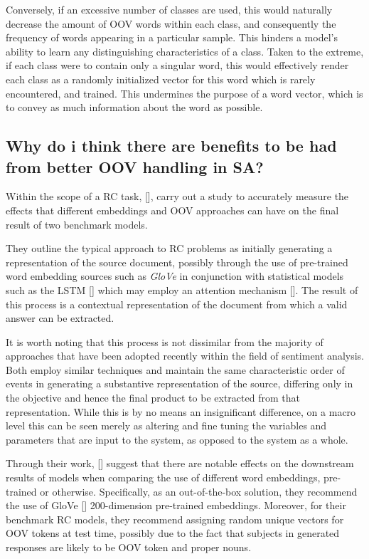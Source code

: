\documentclass[12pt, a4paper]{report}
\theoremstyle{definition}
\theoremstyle{definition}%
\theoremstyle{definition}%
\theoremstyle{definition}%
\theoremstyle{definition}%
\theoremstyle{definition}%
\renewcommand{\cite}[1]{[\citealp{#1}]}
\begin{document}
Conversely, if an excessive number of classes are used, this would naturally decrease the amount of OOV words within each class, and consequently the frequency of words appearing in a particular sample. This hinders a model's ability to learn any distinguishing characteristics of a class. Taken to the extreme, if each class were to contain only a singular word, this would effectively render each class as a randomly initialized vector for this word which is rarely encountered, and trained. This undermines the purpose of a word vector, which is to convey as much information about the word as possible. 

\subsection{Why do i think there are benefits to be had from better OOV handling in SA?}

Within the scope of a RC task, \cite{bhuwandhingra2017}, carry out a study to accurately measure the effects that different embeddings and OOV approaches can have on the final result of two benchmark models. 

They outline the typical approach to RC problems as initially generating a representation of the source document, possibly through the use of pre-trained word embedding sources such as \textit{GloVe} in conjunction with statistical models such as the LSTM \cite{hochreiter1997} which may employ an attention mechanism \cite{bahdanau2014}. The result of this process is a contextual representation of the document from which a valid answer can be extracted. 

It is worth noting that this process is not dissimilar from the majority of approaches that have been adopted recently within the field of sentiment analysis. Both employ similar techniques and maintain the same characteristic order of events in generating a substantive representation of the source, differing only in the objective and hence the final product to be extracted from that representation. While this is by no means an insignificant difference, on a macro level this can be seen merely as altering and fine tuning the variables and parameters that are input to the system, as opposed to the system as a whole. 

Through their work, \cite{bhuwandhingra2017} suggest that there are notable effects on the downstream results of models when comparing the use of different word embeddings, pre-trained or otherwise. Specifically, as an out-of-the-box solution, they recommend the use of GloVe \cite{pennington} 200-dimension pre-trained embeddings. Moreover, for their benchmark RC models, they recommend assigning random unique vectors for OOV tokens at test time, possibly due to the fact that subjects in generated responses are likely to be OOV token and proper nouns. 
\end{document}
